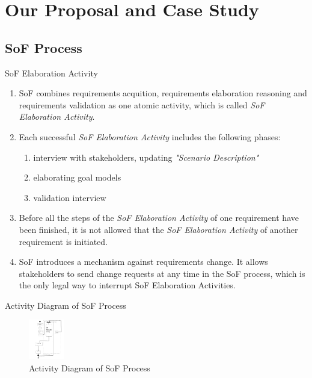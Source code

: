 \documentclass{beamer}
\begin{document}
\section{Our Proposal and Case Study}
\subsection{SoF Process}

\begin{frame}{SoF Elaboration Activity}
  \footnotesize{
  \begin{enumerate}
  \item
    SoF combines requirements acquition, requirements elaboration reasoning and requirements validation as one atomic activity, which is called \emph{SoF Elaboration Activity}.
  \item
    Each successful \emph{SoF Elaboration Activity} includes the following phases: 
    \begin{enumerate}
    \item interview with stakeholders, updating \emph{"Scenario Description"}
    \item elaborating goal models 
    \item validation interview
    \end{enumerate}
  \item
    Before all the steps of the \emph{SoF Elaboration Activity} of one requirement have been finished, it is not allowed that the \emph{SoF Elaboration Activity} of another requirement is initiated.
  \item
    SoF introduces a mechanism against requirements change. It allows stakeholders to send change requests at any time in the SoF process, which is the only legal way to interrupt SoF Elaboration Activities.
  \end{enumerate}
  }
\end{frame}

\begin{frame}{Activity Diagram of SoF Process}
  \begin{figure}
    \includegraphics[width=0.6in]{img/2_0.PNG}
    \caption{Activity Diagram of SoF Process}
  \end{figure}
\end{frame}  
\end{document}

